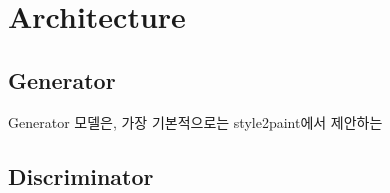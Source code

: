 \section{Architecture}

\subsection{Generator}

Generator 모델은, 가장 기본적으로는 style2paint에서 제안하는 

\subsection{Discriminator}